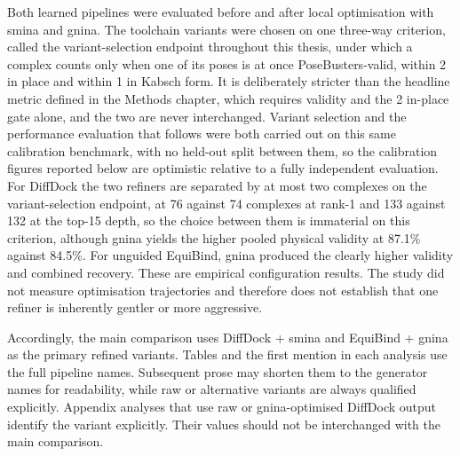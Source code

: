 Both learned pipelines were evaluated before and after local optimisation with smina and gnina. The toolchain variants were chosen on one three-way criterion, called the variant-selection endpoint throughout this thesis, under which a complex counts only when one of its poses is at once PoseBusters-valid, within 2\angstrom{} in place and within 1\angstrom{} in Kabsch form. It is deliberately stricter than the headline metric defined in the Methods chapter, which requires validity and the 2\angstrom{} in-place gate alone, and the two are never interchanged. Variant selection and the performance evaluation that follows were both carried out on this same calibration benchmark, with no held-out split between them, so the calibration figures reported below are optimistic relative to a fully independent evaluation. For DiffDock the two refiners are separated by at most two complexes on the variant-selection endpoint, at 76 against 74 complexes at rank-1 and 133 against 132 at the top-15 depth, so the choice between them is immaterial on this criterion, although gnina yields the higher pooled physical validity at 87.1\% against 84.5\%. For unguided EquiBind, gnina produced the clearly higher validity and combined recovery. These are empirical configuration results. The study did not measure optimisation trajectories and therefore does not establish that one refiner is inherently gentler or more aggressive.

Accordingly, the main comparison uses DiffDock + smina and EquiBind + gnina as the primary refined variants. Tables and the first mention in each analysis use the full pipeline names. Subsequent prose may shorten them to the generator names for readability, while raw or alternative variants are always qualified explicitly. Appendix analyses that use raw or gnina-optimised DiffDock output identify the variant explicitly. Their values should not be interchanged with the main comparison.

